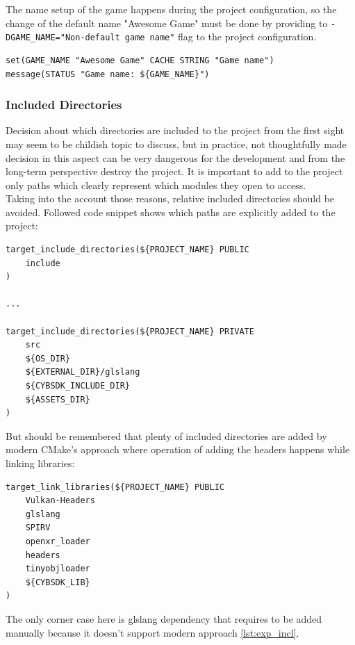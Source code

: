 \label{game_name}
The name setup of the game happens during the project configuration, so the change of the default name "Awesome Game" must be done by providing to \texttt{-DGAME\_NAME="Non-default game name"} flag to the project configuration.
\begin{lstlisting}[caption=Game's preprocessor definitions (./CMakeLists.txt)]
set(GAME_NAME "Awesome Game" CACHE STRING "Game name")
message(STATUS "Game name: ${GAME_NAME}")
\end{lstlisting}

\subsubsection{Included Directories}
\hspace{\parindent} Decision about which directories are included to the project from the first sight may seem to be childish topic to discuss, but in practice, not thoughtfully made decision in this aspect can be very dangerous for the development and from the long-term perspective destroy the project. It is important to add to the project only paths which clearly represent which modules they open to access.\\
Taking into the account those reasons, relative included directories should be avoided.
Followed code snippet shows which paths are explicitly added to the project:
\label{lst:exp_incl}
\begin{lstlisting}[caption=Explicitly included directories (./engine/CMakeLists.txt)]
target_include_directories(${PROJECT_NAME} PUBLIC
    include
)

...

target_include_directories(${PROJECT_NAME} PRIVATE
    src
    ${OS_DIR}
    ${EXTERNAL_DIR}/glslang
    ${CYBSDK_INCLUDE_DIR}
    ${ASSETS_DIR}
)
\end{lstlisting}

But should be remembered that plenty of included directories are added by modern CMake's approach where operation of adding the headers happens while linking libraries: 
\begin{lstlisting}[caption=Implicitly added directories (./engine/CMakeLists.txt)]
target_link_libraries(${PROJECT_NAME} PUBLIC
    Vulkan-Headers
    glslang
    SPIRV
    openxr_loader
    headers
    tinyobjloader
    ${CYBSDK_LIB}
)
\end{lstlisting}
The only corner case here is glslang dependency that requires to be added manually because it doesn't support modern approach \ref{lst:exp_incl}.

